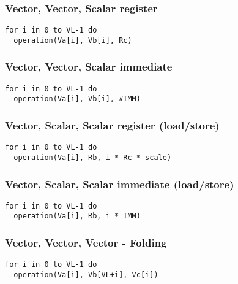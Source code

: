 \subsubsection{Vector, Vector, Scalar register}

\begin{lstlisting}[style=pseudocode]
for i in 0 to VL-1 do
  operation(Va[i], Vb[i], Rc)
\end{lstlisting}

\subsubsection{Vector, Vector, Scalar immediate}

\begin{lstlisting}[style=pseudocode]
for i in 0 to VL-1 do
  operation(Va[i], Vb[i], #IMM)
\end{lstlisting}

\subsubsection{Vector, Scalar, Scalar register (load/store)}

\begin{lstlisting}[style=pseudocode]
for i in 0 to VL-1 do
  operation(Va[i], Rb, i * Rc * scale)
\end{lstlisting}

\subsubsection{Vector, Scalar, Scalar immediate (load/store)}

\begin{lstlisting}[style=pseudocode]
for i in 0 to VL-1 do
  operation(Va[i], Rb, i * IMM)
\end{lstlisting}

\subsubsection{Vector, Vector, Vector - Folding}

\begin{lstlisting}[style=pseudocode]
for i in 0 to VL-1 do
  operation(Va[i], Vb[VL+i], Vc[i])
\end{lstlisting}
